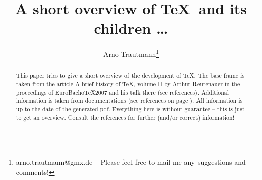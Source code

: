 \documentclass{scrartcl}
\title{A short overview of \TeX\ and its children \dots}
\author{Arno Trautmann\thanks{arno.trautmann@gmx.de -- Please feel free to mail me any suggestions and comments!}}
\date{}
\begin{document}
\maketitle

\begin{abstract}
This paper tries to give a short overview of the development of \TeX. The base frame is taken from the article \textsf{A brief history of \TeX, volume II} by Arthur Reutenauer in the proceedings of \textsf{EuroBacho\TeX 2007} and his talk there (see references). Additional information is taken from documentations (see references on page \pageref{sec:refs}). All information is up to the date of the generated pdf. Everything here is without guarantee -- this is just to get an overview. Consult the references for further (and/or correct) information!
\end{abstract}

\tableofcontents

\clearpage
\end{document}
